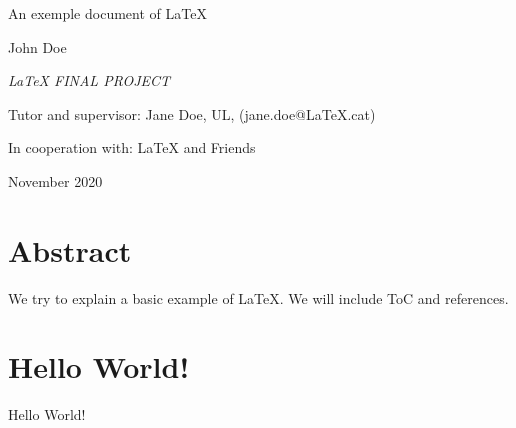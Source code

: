 \documentclass[11pt]{article}
\title{}
\date{}
\author{}
\begin{document}
\begin{titlepage}
\centering
\par
\vspace{1cm}
\Large
{An exemple document of LaTeX\par}
\vspace{1cm}
{John Doe \par}
\vspace{1cm}
{\itshape\Large LaTeX FINAL PROJECT \par}
\vfill

\vspace{1cm}
\par
\vspace{1cm}
\vfill

\large
\raggedright
{Tutor and supervisor: Jane Doe, UL, (jane.doe@LaTeX.cat) \par}
{In cooperation with: LaTeX and Friends \par}
\vspace{2cm}

\raggedleft
\large
November 2020
\par
\end{titlepage}


\setlength{\parskip}{1em}  %
\normalsize  %

\newpage
\section*{Abstract}  %
  We try to explain a basic example of LaTeX. We will include ToC and references.

\newpage
\setlength{\parskip}{0em}  %
\tableofcontents
\newpage

\setlength{\parskip}{1em}  %

\section{Hello World!}
  Hello World!
\end{document}
